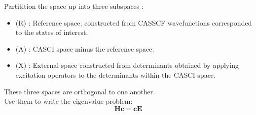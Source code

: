 \documentclass[12pt]{article}
\begin{document}
Partitition the space up into three subspaces :
\begin{itemize}
\item (R) : Reference space; constructed from CASSCF wavefunctions corresponded to the states of interest.
\item (A) : CASCI space minus the reference space.
\item (X) : External space constructed from determinants obtained by applying excitation operators to the determinants within the CASCI space.
\end{itemize}
These three spaces are orthogonal to one another.\\

\noindent Use them to write the eigenvalue problem:
\begin{equation}
\mathbf{Hc} = \mathbf{cE}
\end{equation}
\end{document}
